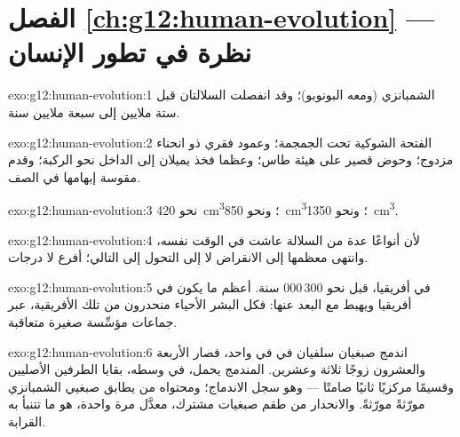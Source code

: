 \section*{الفصل \ref{ch:g12:human-evolution} --- نظرة في تطور الإنسان}

\begin{solution}{exo:g12:human-evolution:1}
الشمبانزي (ومعه البونوبو)؛ وقد انفصلت السلالتان قبل ستة ملايين إلى
سبعة ملايين سنة.
\end{solution}

\begin{solution}{exo:g12:human-evolution:2}
الفتحة الشوكية تحت الجمجمة؛ وعمود فقري ذو انحناء مزدوج؛ وحوض قصير على
هيئة طاس؛ وعظما فخذ يميلان إلى الداخل نحو الركبة؛ وقدم مقوسة إبهامها
في الصف.
\end{solution}

\begin{solution}{exo:g12:human-evolution:3}
نحو \qty{420}{cm^3}؛ ونحو \qty{850}{cm^3}؛ ونحو \qty{1350}{cm^3}.
\end{solution}

\begin{solution}{exo:g12:human-evolution:4}
لأن أنواعًا عدة من السلالة عاشت في الوقت نفسه، وانتهى معظمها إلى
الانقراض لا إلى التحول إلى  التالي؛  أفرع لا درجات.
\end{solution}

\begin{solution}{exo:g12:human-evolution:5}
في أفريقيا، قبل نحو 300\,000 سنة.  أعظم ما يكون في
أفريقيا ويهبط مع البعد عنها: فكل البشر الأحياء منحدرون من تلك 
الأفريقية، عبر جماعات مؤسِّسة صغيرة متعاقبة.
\end{solution}

\begin{solution}{exo:g12:human-evolution:6}
اندمج صبغيان سلفيان في  في  واحد، فصار الأربعة
والعشرون زوجًا ثلاثة وعشرين.  المندمج يحمل، في وسطه، بقايا
الطرفين الأصليين وقسيمًا مركزيًا ثانيًا صامتًا --- وهو سجل الاندماج؛
ومحتواه من  يطابق صبغيي الشمبانزي مورّثةً مورّثةً. والانحدار
من طقم صبغيات مشترك، معدَّل مرة واحدة، هو ما تتنبأ به القرابة.
\end{solution}

